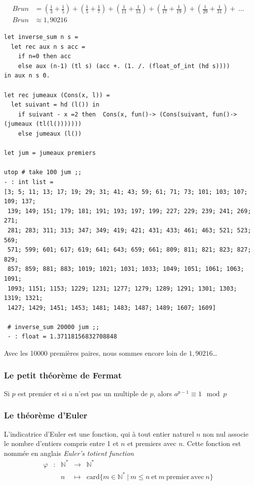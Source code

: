 \documentclass[11pt]{book}
\begin{document}
\begin{align*}
   Brun &= (\frac{1}{3} + \frac{1}{5}) + (\frac{1}{5} + \frac{1}{7}) + (\frac{1}{11} + \frac{1}{13}) + (\frac{1}{17} + \frac{1}{19}) + (\frac{1}{29} + \frac{1}{31}) +\  ...  \\
   Brun &\approx 1,90216
\end{align*}


\begin{Verbatim}
let inverse_sum n s = 
  let rec aux n s acc =
 	if n=0 then acc
	else aux (n-1) (tl s) (acc +. (1. /. (float_of_int (hd s))))
in aux n s 0. 

let rec jumeaux (Cons(x, l)) =
  let suivant = hd (l()) in
    if suivant - x =2 then  Cons(x, fun()-> (Cons(suivant, fun()-> (jumeaux (tl(l()))))))
    else jumeaux (l()) 

let jum = jumeaux premiers 

utop # take 100 jum ;;
- : int list =
[3; 5; 11; 13; 17; 19; 29; 31; 41; 43; 59; 61; 71; 73; 101; 103; 107; 109; 137;
 139; 149; 151; 179; 181; 191; 193; 197; 199; 227; 229; 239; 241; 269; 271;
 281; 283; 311; 313; 347; 349; 419; 421; 431; 433; 461; 463; 521; 523; 569;
 571; 599; 601; 617; 619; 641; 643; 659; 661; 809; 811; 821; 823; 827; 829;
 857; 859; 881; 883; 1019; 1021; 1031; 1033; 1049; 1051; 1061; 1063; 1091;
 1093; 1151; 1153; 1229; 1231; 1277; 1279; 1289; 1291; 1301; 1303; 1319; 1321;
 1427; 1429; 1451; 1453; 1481; 1483; 1487; 1489; 1607; 1609]
 
 # inverse_sum 20000 jum ;;
 - : float = 1.37118156832708848
 \end{Verbatim}
 Avec les 10000 premières paires, nous sommes encore loin de $1,90216$\dots

\subsubsection{Le petit théorème de Fermat}
Si $p$ est premier et si $a$ n’est pas un multiple de $p$, alors $a^{p−1}≡1  \mod p$

\subsubsection{Le théorème d'Euler}
L'indicatrice d'Euler est une fonction, qui à tout entier naturel $n$ non nul associe
 le nombre d'entiers compris entre 1 et $n$ et premiers avec $n$. Cette fonction est nommée en anglais
 \textit{Euler's totient function}
$$
\begin{array}{ccccl}
  \varphi & : & \mathbb{N}^* & \longrightarrow & \mathbb{N}^* \\
   & & n& \longmapsto &\mathrm{card}\{ m \in \mathbb{N}^* ~|~m\le n~  \text{et}~m~\mathrm{premier~avec}~n \}
\end{array}
$$
\end{document}
